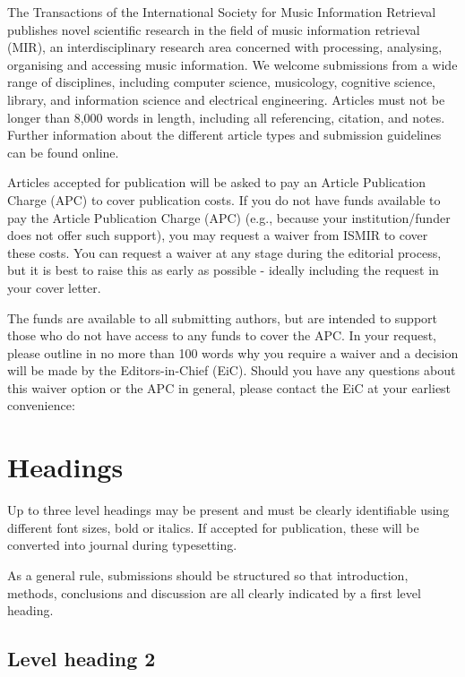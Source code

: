 \documentclass[ProofPDF]{./Styles/Jnls-Template-V3}
\begin{document}
The Transactions of the International Society for Music Information Retrieval publishes novel scientific research in the field of music information retrieval (MIR), an interdisciplinary research area concerned with processing, analysing, organising and accessing music information. We welcome submissions from a wide range of disciplines, including computer science, musicology, cognitive science, library, and information science and electrical engineering.
Articles must not be longer than 8,000 words in length, including all referencing, citation, and notes.
Further information about the different article types and submission guidelines can be found online.

Articles accepted for publication will be asked to pay an Article Publication Charge (APC) to cover publication costs. If you do not have funds available to pay the Article Publication Charge (APC) (e.g., because your institution/funder does not offer such support), you may request a waiver from ISMIR to cover these costs. You can request a waiver at any stage during the editorial process, but it is best to raise this as early as possible - ideally including the request in your cover letter.

The funds are available to all submitting authors, but are intended to support those who do not have access to any funds to cover the APC. In your request, please outline in no more than 100 words why you require a waiver and a decision will be made by the Editors-in-Chief (EiC). Should you have any questions about this waiver option or the APC in general, please contact the EiC at your earliest convenience:



\section{Headings}\label{sec:headings}

Up to three level headings may be present and must be clearly identifiable
using different font sizes, bold or italics. If accepted for publication,
these will be converted into journal during typesetting.

As a general rule, submissions should be structured so that introduction,
methods, conclusions and discussion are all clearly indicated by a first level heading.

\subsection{Level heading 2}
\end{document}
